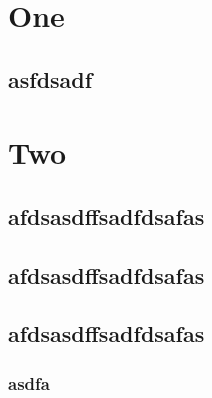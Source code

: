 \documentclass{report}
\begin{document}
\dominitoc
\tableofcontents

\chapter{One}
\minitoc

\section{asfdsadf}

\chapter{Two}
\minitoc

\section{afdsasdffsadfdsafas}
\section{afdsasdffsadfdsafas}
\section{afdsasdffsadfdsafas}
\subsection{asdfa}
\end{document}
